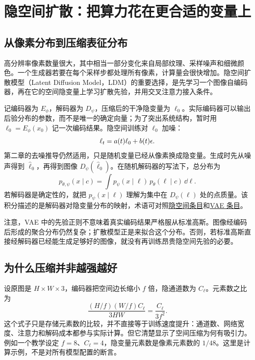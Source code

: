 \section{隐空间扩散：把算力花在更合适的变量上}
\label{sec:application-latent}

\subsection{从像素分布到压缩表征分布}

高分辨率像素数量很大，其中相当一部分变化来自局部纹理、采样噪声和细微颜色。一个生成器若要在每个采样步都处理所有像素，计算量会很快增加。隐空间扩散模型（Latent Diffusion Model，LDM）的重要选择，是先学习一个图像自编码器，再在它的空间隐变量上学习扩散先验，并用交叉注意力接入条件。\cite{c_rombach2022ldm}

记编码器为 $E_\phi$，解码器为 $D_\psi$，压缩后的干净隐变量为 $\ell_0$。实际编码器可以输出后验分布的参数，而不是唯一的确定向量；为了突出系统结构，暂时用 $\ell_0=E_\phi(x_0)$ 记一次编码结果。隐空间训练对 $\ell_0$ 加噪：
\[
\ell_t=a(t)\ell_0+b(t)\epsilon.
\]
第二章的去噪推导仍然适用，只是随机变量已经从像素换成隐变量。生成时先从噪声得到 $\widehat\ell_0$，再得到图像 $D_\psi(\widehat\ell_0)$。在随机解码器的写法下，总分布为
\begin{equation}
p_{\theta,\psi}(x\mid c)
=\int p_\psi(x\mid\ell)\,p_\theta(\ell\mid c)\,\dd\ell.
\label{eq:application-latent-model}
\end{equation}
若解码器是确定性的，就把 $p_\psi(x\mid\ell)$ 理解为集中在 $D_\psi(\ell)$ 处的点质量。该积分描述的是解码器对隐变量分布的映射，术语可对照\hyperref[gl:latent]{隐空间条目}和\hyperref[gl:vae]{VAE 条目}。

注意，VAE 中的先验正则不意味着真实编码结果严格服从标准高斯。图像经编码后形成的聚合分布仍然复杂；扩散模型正是来拟合这个分布。否则，若标准高斯直接经解码器已经能生成足够好的图像，就没有再训练昂贵隐空间先验的必要。

\subsection{为什么压缩并非越强越好}

设原图是 $H\times W\times 3$，编码器把空间边长缩小 $f$ 倍，隐通道数为 $C_\ell$。元素数之比为
\[
\frac{(H/f)(W/f)C_\ell}{3HW}
=\frac{C_\ell}{3f^2}.
\]
这个式子只是存储元素数的比较，并不直接等于训练速度提升：通道数、网络宽度、注意力和解码成本都参与实际计算。但它清楚显示了空间压缩为何有吸引力。例如一个教学设定 $f=8$、$C_\ell=4$，隐变量元素数是像素元素数的 $1/48$。这里是计算示例，不是对所有模型配置的断言。

